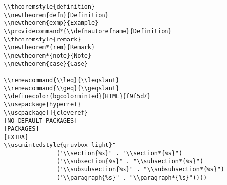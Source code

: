 \documentclass[c]{article}
\theoremstyle{plain}%
\theoremstyle{definition}
\providecommand*{\defnautorefname}{Definition}
\theoremstyle{remark}
\renewcommand{\leq}{\leqslant}
\renewcommand{\geq}{\geqslant}
\begin{document}
\begin{verbatim}
\\theoremstyle{definition}
\\newtheorem{defn}{Definition}
\\newtheorem{exmp}{Example}
\\providecommand*{\\defnautorefname}{Definition}
\\theoremstyle{remark}
\\newtheorem*{rem}{Remark}
\\newtheorem*{note}{Note}
\\newtheorem{case}{Case}

\\renewcommand{\\leq}{\\leqslant}
\\renewcommand{\\geq}{\\geqslant}
\\definecolor{bgcolorminted}{HTML}{f9f5d7}
\\usepackage{hyperref}
\\usepackage[]{cleveref}
[NO-DEFAULT-PACKAGES]
[PACKAGES]
[EXTRA]
\\usemintedstyle{gruvbox-light}"
               ("\\section{%s}" . "\\section*{%s}")
               ("\\subsection{%s}" . "\\subsection*{%s}")
               ("\\subsubsection{%s}" . "\\subsubsection*{%s}")
               ("\\paragraph{%s}" . "\\paragraph*{%s}"))))
\end{verbatim}
\end{document}
